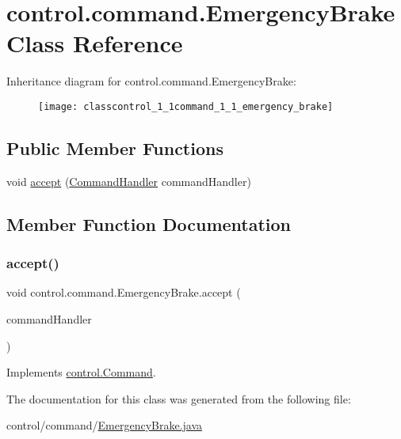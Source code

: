 \hypertarget{classcontrol_1_1command_1_1_emergency_brake}{}\section{control.\+command.\+Emergency\+Brake Class Reference}
\label{classcontrol_1_1command_1_1_emergency_brake}
Inheritance diagram for control.\+command.\+Emergency\+Brake\+:\begin{figure}[H]
\begin{center}
\leavevmode
\texttt{[image: classcontrol\_1\_1command\_1\_1\_emergency\_brake]}
\end{center}
\end{figure}
\subsection*{Public Member Functions}
\begin{DoxyCompactItemize}
\item 
void \mbox{\hyperlink{classcontrol_1_1command_1_1_emergency_brake_adabaf905354a3c45d60c76dd94efd1e3}{accept}} (\mbox{\hyperlink{interfacecontrol_1_1_command_handler}{Command\+Handler}} command\+Handler)
\end{DoxyCompactItemize}


\subsection{Member Function Documentation}
\mbox{\label{classcontrol_1_1command_1_1_emergency_brake_adabaf905354a3c45d60c76dd94efd1e3}} 
\subsubsection{\texorpdfstring{accept()}{accept()}}
{\footnotesize\ttfamily void control.\+command.\+Emergency\+Brake.\+accept (\begin{DoxyParamCaption}\item[{\mbox{\hyperlink{interfacecontrol_1_1_command_handler}{Command\+Handler}}}]{command\+Handler }\end{DoxyParamCaption})}



Implements \mbox{\hyperlink{interfacecontrol_1_1_command_ab81fb31e9d98dfbfbfb7026a5bc823a6}{control.\+Command}}.



The documentation for this class was generated from the following file\+:\begin{DoxyCompactItemize}
\item 
control/command/\mbox{\hyperlink{_emergency_brake_8java}{Emergency\+Brake.\+java}}\end{DoxyCompactItemize}
